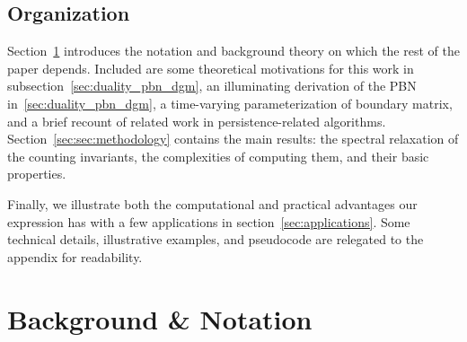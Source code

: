 \documentclass[10pt]{article}
\numberwithin{equation}{section}
\newcommand{\+}{%
	\raisebox{0.18ex}{\scaleobj{0.55}{+}}
}
\theoremstyle{definition}
\begin{document}
\subsection{Organization}
Section~\ref{sec:background_notation} introduces the notation and background theory on which the rest of the paper depends. Included are some theoretical motivations for this work in subsection~\ref{sec:duality_pbn_dgm}, an illuminating derivation of the PBN in~\ref{sec:duality_pbn_dgm}, a time-varying parameterization of boundary matrix, and a brief recount of related work in persistence-related algorithms.
Section~\ref{sec:sec:methodology} contains the main results: the spectral relaxation of the counting invariants, the complexities of computing them, and their basic properties.
  

Finally, we illustrate both the computational and practical advantages our expression has with a few applications in section~\ref{sec:applications}. 
Some technical details, illustrative examples, and pseudocode are relegated to the appendix for readability.


\section{Background \& Notation}\label{sec:background_notation}

\end{document}
